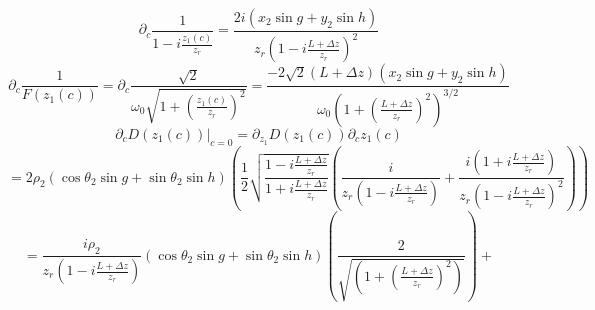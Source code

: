 \documentclass[11pt]{amsart}
\makeatletter
\newcommand{\0}{\varnothing}		%
\newcommand{\pp}{\partial}					%
\newcommand{\1}{!}
\newcommand{\2}{@}
\newcommand{\3}{\#}
\newcommand{\4}{\$}
\newcommand{\5}{\%}
\newcommand{\6}{$^\wedge$}
\newcommand{\7}{\&}
\newcommand{\8}{*}
\newcommand{\9}{(}
\makeatother
\begin{document}
\[
\pp_c \frac{1}{1-i\frac{z_1(c)}{z_r}} = \frac{2i\left(x_2\sin g+y_2\sin h\right)}{z_r\left(1-i\frac{L+\Delta z}{z_r}\right)^2}
\]
\[
\pp_c\frac{1}{F(z_1(c))} = \pp_c\frac{\sqrt{2}}{\omega_0\sqrt{1+\left(\frac{z_1(c)}{z_r}\right)^2}} = \frac{-2\sqrt{2}\left(L+\Delta z\right)\left(x_2\sin g+y_2\sin h\right)}{\omega_0\left(1+\left(\frac{L+\Delta z}{z_r}\right)^2\right)^{3/2}}
\]
\[
\left.\pp_c D(z_1(c))\right|_{c=0} = \pp_{z_1}D(z_1(c))\pp_c z_1(c) \]\[= 2\rho_2\left(\cos\theta_2 \sin g+\sin \theta_2\sin h\right)\left(\frac{1}{2}\sqrt{\frac{1-i\frac{L+\Delta z}{z_r}}{1+i\frac{L+\Delta z}{z_r}}}\left(\frac{i}{z_r\left(1-i\frac{L+\Delta z}{z_r}\right)}+\frac{i\left(1+i\frac{L+\Delta z}{z_r}\right)}{z_r\left(1-i\frac{L+\Delta z}{z_r}\right)^2}\right)\right)
\]
\[
=\frac{i\rho_2}{z_r\left(1-i\frac{L+\Delta z}{z_r}\right)}\left(\cos\theta_2\sin g+\sin \theta_2\sin h\right)\left(\frac{2}{\sqrt{\left(1+\left(\frac{L+\Delta z}{z_r}\right)^2\right)}}\right)+
\]
\newpage
\end{document}
